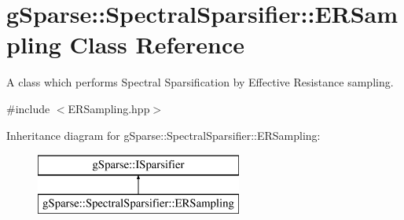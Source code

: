\hypertarget{classg_sparse_1_1_spectral_sparsifier_1_1_e_r_sampling}{}\section{g\+Sparse\+:\+:Spectral\+Sparsifier\+:\+:E\+R\+Sampling Class Reference}
\label{classg_sparse_1_1_spectral_sparsifier_1_1_e_r_sampling}


A class which performs Spectral Sparsification by Effective Resistance sampling.  




{\ttfamily \#include $<$E\+R\+Sampling.\+hpp$>$}

Inheritance diagram for g\+Sparse\+:\+:Spectral\+Sparsifier\+:\+:E\+R\+Sampling\+:\begin{figure}[H]
\begin{center}
\leavevmode
\includegraphics[height=2.000000cm]{classg_sparse_1_1_spectral_sparsifier_1_1_e_r_sampling}
\end{center}
\end{figure}
